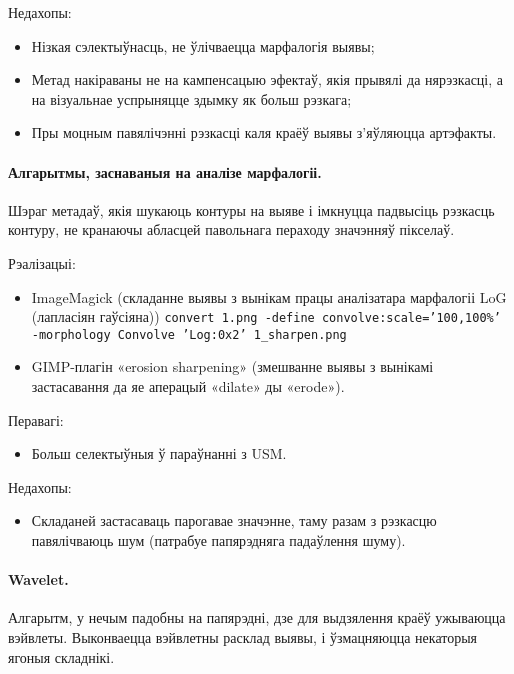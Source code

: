 \documentclass[10pt, a5paper]{article}
\begin{document}
Недахопы:

\begin{itemize}
  \item Нізкая сэлектыўнасць, не ўлічваецца марфалогія выявы;
  \item Метад накіраваны не на кампенсацыю эфектаў, якія прывялі да нярэзкасці, а на візуальнае успрыняцце здымку як больш рэзкага;
  \item Пры моцным павялічэнні рэзкасці каля краёў выявы з’яўляюцца артэфакты.
\end{itemize}

\paragraph*{Алгарытмы, заснаваныя на аналізе марфалогіі.} Шэраг метадаў, якія шукаюць контуры на выяве і імкнуцца падвысіць рэзкасць контуру, не кранаючы абласцей павольнага пераходу значэнняў пікселаў.

Рэалізацыі:
\begin{itemize}
  \item ImageMagick (складанне выявы з вынікам працы аналізатара марфалогіі LoG (лапласіян гаўсіяна)\cite{litv1})
\texttt{convert 1.png -define convolve:scale='100,100\%' -morphology Convolve 'Log:0x2' 1\_sharpen.png}
\end{itemize}

\begin{itemize}
  \item GIMP-плагін «erosion sharpening» (змешванне выявы з вынікамі застасавання да яе аперацый «dilate» ды «erode»).
\end{itemize}

Перавагі:
\begin{itemize}
  \item Больш селектыўныя ў параўнанні з USM.
\end{itemize}

Недахопы:
\begin{itemize}
  \item Складаней застасаваць парогавае значэнне, таму разам з рэзкасцю павялічваюць шум (патрабуе папярэдняга падаўлення шуму).
\end{itemize}

\paragraph*{Wavelet.} Алгарытм, у нечым падобны на папярэдні, дзе для выдзялення краёў ужываюцца вэйвлеты. Выконваецца вэйвлетны расклад выявы, і ўзмацняюцца некаторыя ягоныя складнікі.
\end{document}
